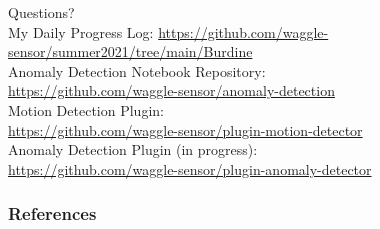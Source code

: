 \documentclass[10pt]{beamer}
\begin{document}
{
\begin{frame}[standout]
  Questions?\\[8mm]
  \small{My Daily Progress Log:
  \href{https://github.com/waggle-sensor/summer2021/tree/main/Burdine}{https://github.com/waggle-sensor/summer2021/tree/main/Burdine}\\[6mm]
  Anomaly Detection Notebook Repository:\\[2mm]
  \href{https://github.com/waggle-sensor/anomaly-detection}{https://github.com/waggle-sensor/anomaly-detection}}\\[6mm]
  Motion Detection Plugin:\\[2mm]
  \href{https://github.com/waggle-sensor/plugin-motion-detector}{https://github.com/waggle-sensor/plugin-motion-detector}\\[6mm]
  Anomaly Detection Plugin (in progress):\\[2mm]
  \href{https://github.com/waggle-sensor/plugin-anomaly-detector}{https://github.com/waggle-sensor/plugin-anomaly-detector}\\[6mm]
\end{frame}}


\begin{frame}[allowframebreaks]
\frametitle{References}


\end{frame}

\appendix

%
\end{document}
